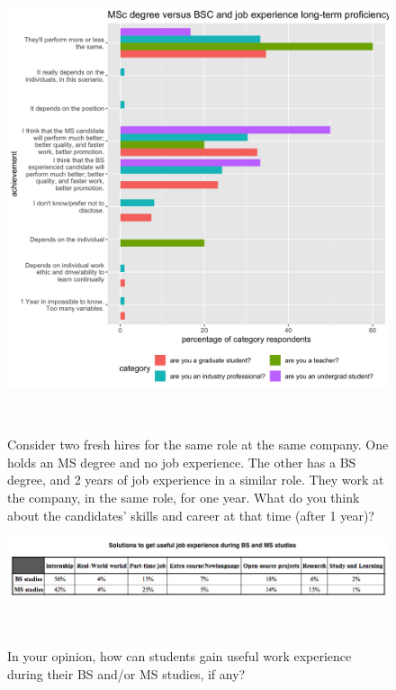 \documentclass{sigchi}
\begin{document}
\begin{figure}
\includegraphics[scale=0.2]{../data-analysis/plots_output/MSc_degree_versus_BSC_and_job_experience_long-term_proficiency.png}
 \caption{Consider two fresh hires for the same role at the same company. One holds an MS degree and no job experience. The other has a BS degree, and 2 years of job experience in a similar role. They work at the company, in the same role, for one year. What do you think about the candidates' skills and career at that time (after 1 year)?}~\label{fig:figure11}
\end{figure}

\begin{figure}
  \centering
  \includegraphics[width=1.75\columnwidth]{../data-analysis/plots_output/Solutions_to_gain_useful_job_experience.png}
  \caption{In your opinion, how can students gain useful work experience during their BS and/or MS studies, if any?}~\label{fig:figure12}
\end{figure}
\end{document}
